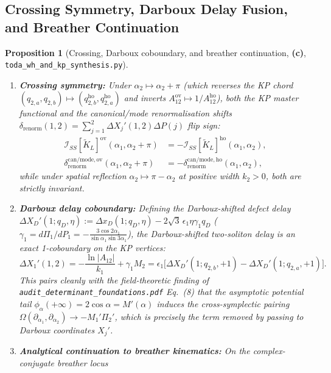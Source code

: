 \documentclass[11pt,a4paper]{article}
\newcommand{\Lc}{\textsf{\textbf{(c)}}}
\newcommand{\scrshort}{\texttt{toda\_\allowbreak wh\_\allowbreak and\_\allowbreak kp\_\allowbreak synthesis.py}}
\newtheorem{proposition}[theorem]{Proposition}
\theoremstyle{remark}
\begin{document}
\subsection{Crossing Symmetry, Darboux Delay Fusion, and Breather Continuation}
\begin{proposition}[Crossing, Darboux coboundary, and breather continuation, \Lc, \scrshort]\label{prop:bootstrap_synthesis}
\begin{enumerate}
\item \textbf{Crossing symmetry:} Under $\alpha_2 \mapsto \alpha_2 + \pi$ (which reverses the KP chord
  $(q_{2,a},q_{2,b}) \mapsto (q_{2,b}^{\mathrm{ho}},q_{2,a}^{\mathrm{ho}})$ and inverts $A_{12}^{\mathrm{ov}} \mapsto 1/A_{12}^{\mathrm{ho}}$),
  both the KP master functional and the canonical/mode renormalisation shifts
  $\delta_{\mathrm{renorm}}(1,2) = \sum_{j=1}^2 \Delta X_j'(1,2)\Delta P(j)$ flip sign:
  \begin{align}
    \mathcal{I}_{SS}[\widetilde{K}_L]^{\mathrm{ov}}(\alpha_1,\alpha_2+\pi) &= -\mathcal{I}_{SS}[\widetilde{K}_L]^{\mathrm{ho}}(\alpha_1,\alpha_2), \\
    \delta_{\mathrm{renorm}}^{\mathrm{can/mode,ov}}(\alpha_1,\alpha_2+\pi) &= -\delta_{\mathrm{renorm}}^{\mathrm{can/mode,ho}}(\alpha_1,\alpha_2),
  \end{align}
  while under spatial reflection $\alpha_2 \mapsto \pi - \alpha_2$ at positive width $k_2 > 0$, both are
  strictly invariant.
\item \textbf{Darboux delay coboundary:} Defining the Darboux-shifted defect delay
  $\Delta X_D'(1;q_D,\eta) := \Delta x_D(1;q_D,\eta) - 2\sqrt{3}\,\epsilon_1\eta\gamma_1 q_D$
  ($\gamma_1 = d\Pi_1/dP_1 = -\frac{3\cos 2\alpha_1}{\sin\alpha_1\sin 3\alpha_1}$), the Darboux-shifted
  two-soliton delay is an exact 1-coboundary on the KP vertices:
  \begin{equation}
    \Delta X_1'(1,2) = -\frac{\ln|A_{12}|}{k_1} + \gamma_1 M_2
    = \epsilon_1\big[\Delta X_D'(1;q_{2,b},+1) - \Delta X_D'(1;q_{2,a},+1)\big].
  \end{equation}
  This pairs cleanly with the field-theoretic finding of \texttt{audit\_determinant\_foundations.pdf} Eq.~(8)
  that the asymptotic potential tail $\phi_\alpha(+\infty) = 2\cos\alpha = M'(\alpha)$ induces the
  cross-symplectic pairing $\Omega(\partial_{\alpha_1},\partial_{\alpha_2}) \to -M_1'\Pi_2'$, which is
  precisely the term removed by passing to Darboux coordinates $X_j'$.
\item \textbf{Analytical continuation to breather kinematics:} On the complex-conjugate breather locus

\end{enumerate}
\end{proposition}
\end{document}
